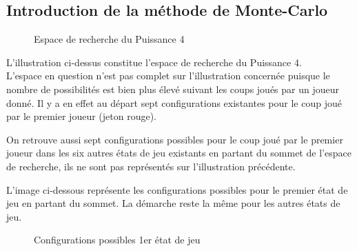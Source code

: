 \documentclass[a4paper]{article}
\begin{document}
\newpage
\subsection{Introduction de la méthode de Monte-Carlo}

\begin{figure}[!h]
\centering
{}

\caption{Espace de recherche du Puissance 4} 
\end{figure} 


L'illustration ci-dessus constitue l'espace de recherche du Puissance 4.
\\L'espace en question n'est pas complet sur l'illustration concernée puisque le nombre de possibilités est bien plus élevé suivant les coups joués par un joueur donné. Il y a en effet au départ sept configurations existantes pour le coup joué par le premier joueur (jeton rouge). 

On retrouve aussi sept configurations possibles pour le coup joué par le premier joueur dans les six autres états de jeu existants en partant du sommet de l'espace de recherche, ils ne sont pas représentés sur l'illustration précédente.

L'image ci-dessous représente les configurations possibles pour le premier état de jeu en partant du sommet. La démarche reste la même pour les autres états de jeu.

\begin{figure}[!h]
\centering
{}

\caption{Configurations possibles 1er état de jeu} 
\end{figure} 
\end{document}

